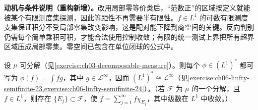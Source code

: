\documentclass[../../main.tex]{subfiles}
\begin{document}
\begin{remark}
\textbf{动机与条件说明（重构新增）。}改用局部零等价类后，“范数正”的区域按定义就能被某个有限测度集探测，因此等距性不再需要半有限性。$f\in L^1$ 的可数有限测度支集保证积分不受局部零集改变影响，这是配对能下降到商空间的关键。反向判别仍需每个简单乘积可积，才能合法使用控制收敛；有限的统一测试上界把所有超界区域压成局部零集。零空间已包含在单位闭球的公式中。
\end{remark}
\begin{exercise}\label{exercise:ch06-linfty-semifinite-25}
设 $\mu$ 可分解（见\cref{exercise:ch03-decomposable-measure}）。则每个 $\phi\in(L^1)^*$ 都可写为 $\phi(f)=\int fg$，其中 $g\in\mathcal L^\infty$，因而 $(L^1)^*\cong\mathcal L^\infty$（见\cref{exercise:ch06-linfty-semifinite-23,exercise:ch06-linfty-semifinite-24}）。（若 $\mathscr F$ 为 $\mu$ 的一个分解，且 $f\in L^1$，则存在 $\{E_j\}\subset\mathscr F$，使 $f=\sum_{j=1}^\infty f\chi_{E_j}$，其中级数在 $L^1$ 中收敛。）
\end{exercise}
\end{document}
